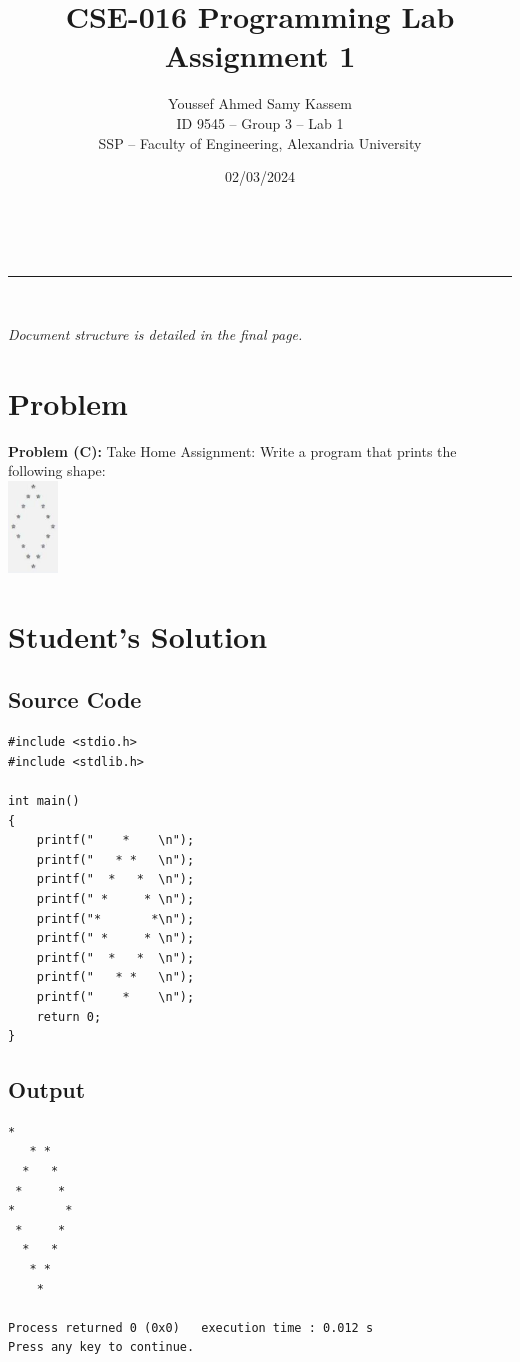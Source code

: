 \documentclass[a4paper,11pt]{article}
\makeatletter
\newcommand{\linia}{\rule{\linewidth}{0.5pt}}
\theoremstyle{mytheor}
\renewcommand{\maketitle}{
\begin{center}
\vspace{2ex}
{\huge \textsc{\@title}}
\vspace{1ex}
\\
\linia\\
\@date \hfill
\@author
\vspace{4ex}
\end{center}
}
\makeatother
\begin{document}
\title{CSE-016 Programming Lab Assignment \textnumero{} 1}

\date{02/03/2024}

\author{Youssef Ahmed Samy Kassem\\ \hfill ID 9545 -- Group 3 -- Lab 1\\ \hfill SSP -- Faculty of Engineering, Alexandria University\\}


\maketitle
\textit{Document structure is detailed in the final page.}
\section{Problem}
\textbf{Problem (C):} Take Home Assignment: Write a program that prints the following shape:\\
\includegraphics[width=0.1\textwidth, center]{image.png}

\section{Student's Solution}
\subsection{Source Code}
\begin{lstlisting}[label={list:first},title=Program's \texttt{\color{inlinecode}{main.c}} File -- Uses \texttt{\color{inlinecode}{printf()}} to output a line-by-line representation of the polygon.]
#include <stdio.h>
#include <stdlib.h>

int main()
{
    printf("    *    \n");
    printf("   * *   \n");
    printf("  *   *  \n");
    printf(" *     * \n");
    printf("*       *\n");
    printf(" *     * \n");
    printf("  *   *  \n");
    printf("   * *   \n");
    printf("    *    \n");
    return 0;
}
\end{lstlisting}
\subsection{Output}
\begin{lstlisting}[language=Tex,numbers=none,label={list:second},title=Program's output to console -- in plaintext.]
    *
   * *
  *   *
 *     *
*       *
 *     *
  *   *
   * *
    *

Process returned 0 (0x0)   execution time : 0.012 s
Press any key to continue.
\end{lstlisting}
\end{document}
